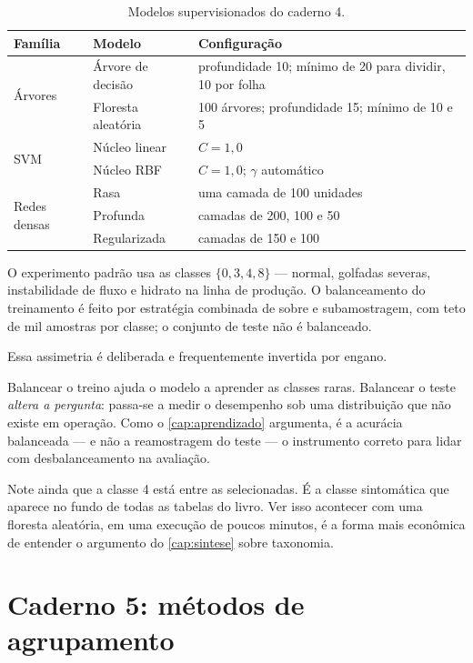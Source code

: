 \begin{table}[htbp]
\centering
\caption{Modelos supervisionados do caderno 4.}
\label{tab:pratica-supervisionado}
\small
\begin{tabular}{llp{5.6cm}}
\toprule
\textbf{Família} & \textbf{Modelo} & \textbf{Configuração} \\
\midrule
\multirow{2}{*}{Árvores}
& Árvore de decisão & profundidade 10; mínimo de 20 para dividir, 10 por folha \\
& Floresta aleatória & 100 árvores; profundidade 15; mínimo de 10 e 5 \\
\midrule
\multirow{2}{*}{SVM}
& Núcleo linear & $C = 1{,}0$ \\
& Núcleo RBF & $C = 1{,}0$; $\gamma$ automático \\
\midrule
\multirow{3}{*}{Redes densas}
& Rasa & uma camada de 100 unidades \\
& Profunda & camadas de 200, 100 e 50 \\
& Regularizada & camadas de 150 e 100 \\
\bottomrule
\end{tabular}
\end{table}

O experimento padrão usa as classes $\{0, 3, 4, 8\}$ --- normal, golfadas severas,
instabilidade de fluxo e hidrato na linha de produção. O balanceamento do treinamento é
feito por estratégia combinada de sobre e subamostragem, com teto de mil amostras por
classe; o conjunto de teste não é balanceado.

\begin{destaque}
Essa assimetria é deliberada e frequentemente invertida por engano.

Balancear o treino ajuda o modelo a aprender as classes raras. Balancear o teste
\emph{altera a pergunta}: passa-se a medir o desempenho sob uma distribuição que não
existe em operação. Como o \cref{cap:aprendizado} argumenta, é a acurácia balanceada ---
e não a reamostragem do teste --- o instrumento correto para lidar com desbalanceamento
na avaliação.

Note ainda que a classe 4 está entre as selecionadas. É a classe sintomática que aparece
no fundo de todas as tabelas do livro. Ver isso acontecer com uma floresta aleatória, em
uma execução de poucos minutos, é a forma mais econômica de entender o argumento do
\cref{cap:sintese} sobre taxonomia.
\end{destaque}

\section{Caderno 5: métodos de agrupamento}

